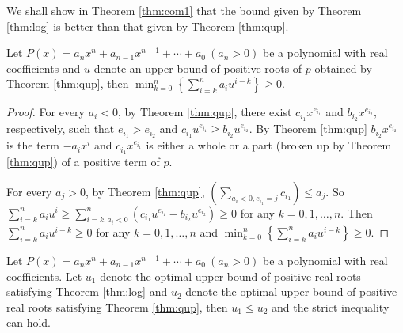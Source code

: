 \documentclass[10pt,a4paper]{article}
\begin{document}


We shall show in Theorem \ref{thm:com1} that the bound given by Theorem \ref{thm:log} is better than that given by Theorem \ref{thm:qup}.

\begin{theorem}\label{thm:com}
   Let $P(x)=a_nx^n+a_{n-1}x^{n-1}+\cdots+a_0\ (a_n>0)$ be a polynomial with real coefficients and   $u$ denote an upper bound of positive roots of $p$ obtained by Theorem \ref{thm:qup}, then $\min_{k=0}^{n}\left\{  \sum_{i=k}^n a_i u^{i-k}\right\}\ge0$.

\end{theorem}

\begin{proof}

  For every $ a_i<0$, by Theorem \ref{thm:qup}, there exist  $c_{i_1}x^{e_{i_1}}$ and $b_{i_2}x^{e_{i_2}},$  respectively, such that
    $e_{i_1}>e_{i_2}$ and $c_{i_1}u^{e_{i_1}}\ge b_{i_2}u^{e_{i_2}}$. By  Theorem \ref{thm:qup} $b_{i_2}x^{e_{i_2} }$ is the term $-a_ix^i$
  and $c_{i_1}x^{e_{i_1} }$ is either a whole or a part (broken up by Theorem \ref{thm:qup}) of a positive term of $p$.

  For every  $a_j>0$, by Theorem \ref{thm:qup}, $\left( \sum_{a_i<0,e_{i_1}=j }c_{i_1} \right)\le a_{j}$. So $\sum_{i=k}^na_iu^i\ge \sum_{i=k,a_i<0}^n \left( c_{i_1}u^{e_{i_1}}-
  b_{i_2}u^{e_{i_2}} \right)\ge 0 $ for any $k= 0,1,\ldots,n$. Then $\sum_{i=k}^n a_i u^{i-k}\ge0 $ for any  $k= 0,1,\ldots,n$ and
  $\min_{k=0}^{n}\left\{  \sum_{i=k}^n a_i u^{i-k}\right\}\ge0$.
\end{proof}


\begin{theorem}\label{thm:com1}

  Let $P(x)=a_nx^n+a_{n-1}x^{n-1}+\cdots+a_0\ (a_n>0)$ be a polynomial with real coefficients. Let  $u_1$ denote the optimal upper bound of
  positive real roots satisfying Theorem \ref{thm:log} and $u_2$ denote the optimal upper bound of positive real roots satisfying Theorem \ref{thm:qup}, then $u_1\le u_2$ and the  strict inequality can hold.
\end{theorem}
\end{document}
